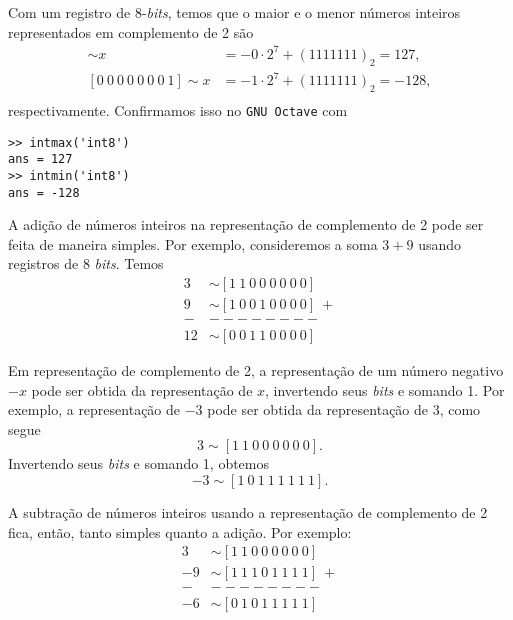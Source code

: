 \begin{ex}
  Com um registro de $8$-{\it bits}, temos que o maior e o menor números inteiros representados em complemento de 2 são
  \begin{align}
    [1 ~ 1 ~ 1 ~ 1 ~ 1 ~ 1 ~ 1 ~ 0] \sim x &= -0\cdot 2^7 + (1111111)_2 = 127,\\
    [0 ~ 0 ~ 0 ~ 0 ~ 0 ~ 0 ~ 0 ~ 1] \sim x &= -1\cdot 2^7 + (1111111)_2 = -128,\\
  \end{align}
  respectivamente.  
\ifisoctave Confirmamos isso no \verb+GNU Octave+ com
\begin{verbatim}
>> intmax('int8')
ans = 127
>> intmin('int8')
ans = -128
\end{verbatim}
  \fi
\end{ex}

A adição de números inteiros na representação de complemento de 2 pode ser feita de maneira simples. Por exemplo, consideremos a soma $3 + 9$ usando registros de 8 {\it bits}. Temos
\begin{align}
  3 &\sim [1 ~ 1 ~ 0 ~ 0 ~ 0 ~ 0 ~ 0 ~ 0]\\
  9 &\sim [1 ~ 0 ~ 0 ~ 1 ~ 0 ~ 0 ~ 0 ~ 0] ~ + \\
  - & -------- \\
 12 &\sim [0 ~ 0 ~ 1 ~ 1 ~ 0 ~ 0 ~ 0 ~ 0]
\end{align}

Em representação de complemento de 2, a representação de um número negativo $-x$ pode ser obtida da representação de $x$, invertendo seus {\it bits} e somando 1. Por exemplo, a representação de $-3$ pode ser obtida da representação de $3$, como segue
\begin{equation}
  3 \sim [1 ~ 1 ~ 0 ~ 0 ~ 0 ~ 0 ~ 0 ~ 0].
\end{equation}
Invertendo seus {\it bits} e somando 1, obtemos
\begin{equation}
  -3 \sim [1 ~ 0 ~ 1 ~ 1 ~ 1 ~ 1 ~ 1 ~ 1].
\end{equation}

A subtração de números inteiros usando a representação de complemento de 2 fica, então, tanto simples quanto a adição. Por exemplo:
\begin{align}
  3 &\sim [1 ~ 1 ~ 0 ~ 0 ~ 0 ~ 0 ~ 0 ~ 0]\\
 -9 &\sim [1 ~ 1 ~ 1 ~ 0 ~ 1 ~ 1 ~ 1 ~ 1] ~ + \\
  - & -------- \\
 -6 &\sim [0 ~ 1 ~ 0 ~ 1 ~ 1 ~ 1 ~ 1 ~ 1]
\end{align}

